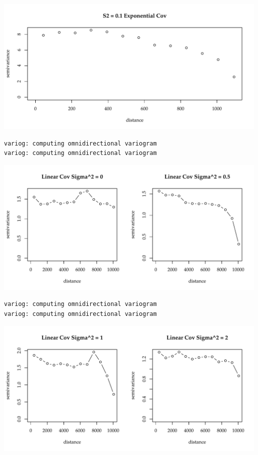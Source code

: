 \documentclass{article}\usepackage[]{graphicx}\usepackage[]{color}
\makeatletter
\def\maxwidth{ %
  \ifdim\Gin@nat@width>\linewidth
    \linewidth
  \else
    \Gin@nat@width
  \fi
}
\newenvironment{kframe}{%
 \def\at@end@of@kframe{}%
 \ifinner\ifhmode%
  \def\at@end@of@kframe{\end{minipage}}%
  \begin{minipage}{\columnwidth}%
 \fi\fi%
 \def\FrameCommand##1{\hskip\@totalleftmargin \hskip-\fboxsep
 \colorbox{shadecolor}{##1}\hskip-\fboxsep
     \hskip-\linewidth \hskip-\@totalleftmargin \hskip\columnwidth}%
 \MakeFramed {\advance\hsize-\width
   \@totalleftmargin\z@ \linewidth\hsize
   \@setminipage}}%
 {\par\unskip\endMakeFramed%
 \at@end@of@kframe}
\newenvironment{knitrout}{}{} %
\makeatother
\begin{document}
\begin{knitrout}
{\centering \includegraphics[width=\maxwidth]{figure/sims_se-3} 

}


\begin{kframe}

{\ttfamily\noindent\bfseries\color{errorcolor}{Error in variog(data = Z, coords = ca\$coords): object 'Z' not found}}\begin{verbatim}
variog: computing omnidirectional variogram
variog: computing omnidirectional variogram
\end{verbatim}
\end{kframe}

{\centering \includegraphics[width=\maxwidth]{figure/sims_se-4} 

}


\begin{kframe}\begin{verbatim}
variog: computing omnidirectional variogram
variog: computing omnidirectional variogram
\end{verbatim}
\end{kframe}

{\centering \includegraphics[width=\maxwidth]{figure/sims_se-5} 

}
\end{knitrout}
\end{document}
